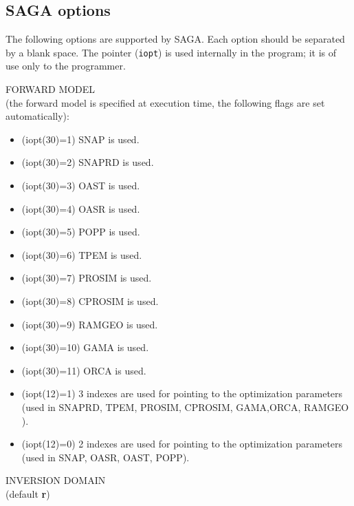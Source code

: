 \documentclass{saclantc}
\begin{document}
\subsection{SAGA options}
\label{se:sagaopt}
The following options are supported by  {\sf SAGA}. Each option should be
separated by a blank space. The pointer ({\tt iopt}) is
used internally in the program; 
it is of use only to the programmer.

\noindent FORWARD MODEL \\
(the forward model is specified at execution time, 
the following flags are set automatically):

\vspace{-0.6cm}
\begin{itemize}
    \item[] (iopt(30)=1) {\sf SNAP} is used.
\vspace{-0.3cm}
    \item[] (iopt(30)=2) {\sf SNAPRD} is used.
\vspace{-0.3cm}
    \item[] (iopt(30)=3) {\sf OAST} is used.
\vspace{-0.3cm}
    \item[] (iopt(30)=4) {\sf OASR} is used.
\vspace{-0.3cm}
    \item[] (iopt(30)=5) {\sf POPP} is used.
\vspace{-0.3cm}
    \item[] (iopt(30)=6) {\sf TPEM} is used.
\vspace{-0.3cm}
    \item[] (iopt(30)=7) {\sf PROSIM} is used.
\vspace{-0.3cm}
    \item[] (iopt(30)=8) {\sf CPROSIM} is used.
\vspace{-0.3cm}
    \item[] (iopt(30)=9) {\sf RAMGEO} is used.
\vspace{-0.3cm}
    \item[] (iopt(30)=10) {\sf GAMA} is used.
\vspace{-0.3cm}
    \item[] (iopt(30)=11) {\sf ORCA} is used.
    \item[] (iopt(12)=1) 3 indexes are used for 
  pointing to the optimization parameters (used in {\sf SNAPRD}, {\sf
  TPEM}, {\sf PROSIM}, {\sf CPROSIM}, {\sf GAMA},{\sf ORCA}, {\sf RAMGEO} ).
\vspace{-0.3cm}
    \item[] (iopt(12)=0) 2 indexes are used for 
  pointing to the optimization parameters (used in {\sf SNAP}, {\sf OASR}, {\sf OAST}, {\sf POPP}).
\end{itemize}
\noindent INVERSION DOMAIN \\
(default {\bf r})
\end{document}
